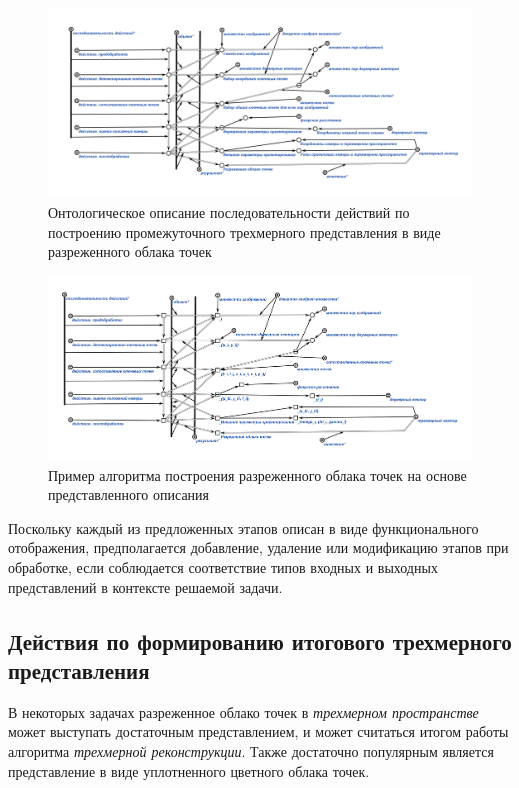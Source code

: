 \begin{figure}[H]
    \includegraphics[scale=0.8, width=1.0\textwidth]{author/part4/figures/reconstruction.png}
    \caption{Онтологическое описание последовательности действий по построению промежуточного трехмерного представления в виде разреженного облака точек}
    \label{fig:reconstruction}
\end{figure}

\begin{figure}[H]
    \includegraphics[scale=0.8, width=1.0\textwidth]{author/part4/figures/reconstruction-example.png}
    \caption{Пример алгоритма построения разреженного облака точек на основе представленного описания}
    \label{fig:reconstruction-example}
\end{figure}

Поскольку каждый из предложенных этапов описан в виде функционального отображения, предполагается добавление, удаление или модификацию этапов при обработке, если соблюдается соответствие типов входных и выходных представлений в контексте решаемой задачи.

\subsection{Действия по формированию итогового трехмерного представления}

В некоторых задачах разреженное облако точек в \textit{трехмерном пространстве} может выступать достаточным представлением, и может считаться итогом работы алгоритма \textit{трехмерной реконструкции}. Также достаточно популярным является представление в виде уплотненного цветного облака точек.

